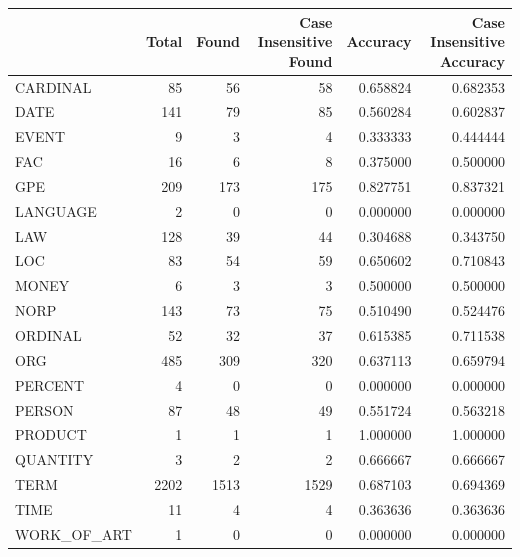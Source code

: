 \begin{tabular}{lrrrrr}
\toprule
 & Total & Found & Case Insensitive Found & Accuracy & Case Insensitive Accuracy \\
\midrule
CARDINAL & 85 & 56 & 58 & 0.658824 & 0.682353 \\
DATE & 141 & 79 & 85 & 0.560284 & 0.602837 \\
EVENT & 9 & 3 & 4 & 0.333333 & 0.444444 \\
FAC & 16 & 6 & 8 & 0.375000 & 0.500000 \\
GPE & 209 & 173 & 175 & 0.827751 & 0.837321 \\
LANGUAGE & 2 & 0 & 0 & 0.000000 & 0.000000 \\
LAW & 128 & 39 & 44 & 0.304688 & 0.343750 \\
LOC & 83 & 54 & 59 & 0.650602 & 0.710843 \\
MONEY & 6 & 3 & 3 & 0.500000 & 0.500000 \\
NORP & 143 & 73 & 75 & 0.510490 & 0.524476 \\
ORDINAL & 52 & 32 & 37 & 0.615385 & 0.711538 \\
ORG & 485 & 309 & 320 & 0.637113 & 0.659794 \\
PERCENT & 4 & 0 & 0 & 0.000000 & 0.000000 \\
PERSON & 87 & 48 & 49 & 0.551724 & 0.563218 \\
PRODUCT & 1 & 1 & 1 & 1.000000 & 1.000000 \\
QUANTITY & 3 & 2 & 2 & 0.666667 & 0.666667 \\
TERM & 2202 & 1513 & 1529 & 0.687103 & 0.694369 \\
TIME & 11 & 4 & 4 & 0.363636 & 0.363636 \\
WORK_OF_ART & 1 & 0 & 0 & 0.000000 & 0.000000 \\
\bottomrule
\end{tabular}
